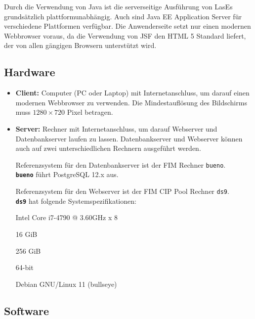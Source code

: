 
Durch die Verwendung von Java ist die serverseitige Ausführung von LasEs
grundsätzlich plattformunabhängig. Auch sind Java EE Application Server für verschiedene Plattformen verfügbar.
Die Anwenderseite setzt nur einen modernen Webbrowser voraus, da die Verwendung von JSF den HTML 5 Standard liefert, der von allen gängigen Browsern unterstützt wird.

\subsection{Hardware}

\begin{itemize}
	\item \textbf{Client:} Computer (PC oder Laptop) mit Internetanschluss, um darauf einen modernen Webbrowser zu verwenden. Die Mindestauflösung des Bildschirms muss $1280 \times 720$ Pixel betragen.

	\item \textbf{Server:} Rechner mit Internetanschluss, um darauf Webserver und Datenbankserver laufen zu lassen. Datenbankserver und Webserver können auch auf zwei unterschiedlichen Rechnern ausgeführt werden.

	\label{dbspezi}
	Referenzsystem für den Datenbankserver ist der FIM Rechner \texttt{bueno}.\\
	\texttt{\textbf{bueno}} führt PostgreSQL 12.x aus.

	\label{spezi}

	Referenzsystem für den Webserver ist der FIM CIP Pool Rechner \texttt{ds9}.\\
	\texttt{\textbf{ds9}} hat folgende Systemspezifikationen:

	\begin{itemize}
		 Intel Core i7-4790 @ 3.60GHz x 8

		 16 GiB

		 256 GiB

		 64-bit

		 Debian GNU/Linux 11 (bullseye)
	\end{itemize}


\end{itemize}

\subsection{Software}

